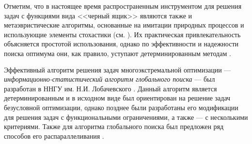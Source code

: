 \documentclass{cmi}
\begin{document}

Отметим, что в настоящее время распространенным инструментом для решения задач с функциями вида <<черный ящик>> являются также и метаэвристические алгоритмы, основанные на имитации природных процессов и использующие элементы стохастики (см. \cite{Yang2013,Gendreau2010,Eiben2015}). Их практическая привлекательность объясняется простотой использования, однако по эффективности и надежности поиска оптимума они, как правило, уступают детерминированным методам \cite{Kvasov2018,Sergeyev2018}.



Эффективный алгоритм решения задач многоэкстремальной оптимизации --- \textit{информационно-статистический алгоритм глобального поиска} --- был разработан в ННГУ им. Н.И. Лобачевского \cite{Strongin2000}. 
Данный алгоритм является детерминированным и в исходном виде был ориентирован на решение задач безусловной оптимизации, однако позднее были разработаны его модификации для решения задач с функциональными ограничениями, а также --- с несколькими критериями. 
Также для алгоритма глобального поиска был предложен ряд способов его распараллеливания \cite{Barkalov2016,globalizerSystem,Strongin2018}.
\end{document}

